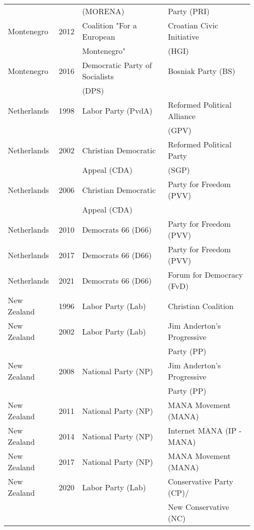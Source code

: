 {\begin{longtable}{|l|c|l|l|}
               &      &        (MORENA)  &   Party (PRI)   \\ 
  Montenegro & 2012 &   Coalition "For a European    &   Croatian Civic Initiative \\ 
               &      &        Montenegro" &     (HGI) \\ 
  Montenegro & 2016 &   Democratic Party of Socialists &   Bosniak Party (BS) \\ 
               &      &     (DPS)     &     \\ 
   Netherlands & 1998 &   Labor Party (PvdA) &   Reformed Political Alliance  \\ 
               &      &         &    (GPV) \\ 
  Netherlands & 2002 &   Christian Democratic &   Reformed Political Party  \\ 
               &      &     Appeal (CDA)     &   (SGP)  \\ 
  Netherlands & 2006 &   Christian Democratic  &   Party for Freedom (PVV) \\ 
               &      &       Appeal (CDA)  &     \\ 
  Netherlands & 2010 &   Democrats 66 (D66) &   Party for Freedom (PVV) \\ 
  Netherlands & 2017 &   Democrats 66 (D66) &   Party for Freedom (PVV) \\ 
  Netherlands & 2021 &   Democrats 66 (D66) &   Forum for Democracy (FvD) \\ 
   New Zealand & 1996 &   Labor Party (Lab) &   Christian Coalition \\ 
   New Zealand & 2002 &   Labor Party (Lab) &   Jim Anderton's Progressive   \\ 
               &      &         &    Party (PP)  \\ 
   New Zealand & 2008 &   National Party (NP) &   Jim Anderton's Progressive  \\ 
               &      &         &   Party (PP)    \\ 
   New Zealand & 2011 &   National Party (NP) &   MANA Movement (MANA) \\ 
  New Zealand & 2014 &   National Party (NP) &   Internet MANA (IP - MANA)   \\ 
   New Zealand & 2017 &   National Party (NP) &   MANA Movement (MANA) \\ 
   New Zealand & 2020 &   Labor Party (Lab) &   Conservative Party (CP)/   \\ 
               &      &         &    New Conservative (NC) \\ 

\end{longtable}}

